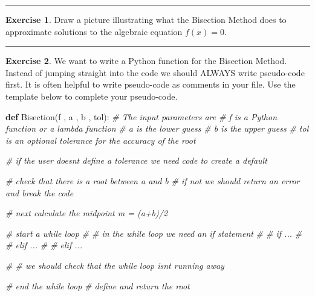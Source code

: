 \documentclass[
]{book}
\newenvironment{Shaded}{\begin{snugshade}}{\end{snugshade}}
\newcommand{\CommentTok}[1]{\textcolor[rgb]{0.56,0.35,0.01}{\textit{#1}}}
\newcommand{\KeywordTok}[1]{\textcolor[rgb]{0.13,0.29,0.53}{\textbf{#1}}}
\newcommand{\NormalTok}[1]{#1}
\theoremstyle{definition}
\theoremstyle{definition}
\theoremstyle{definition}
\newtheorem{exercise}{Exercise}[chapter]
\theoremstyle{remark}
\begin{document}
\begin{center}\rule{0.5\linewidth}{0.5pt}\end{center}

\begin{exercise}
\protect\hypertarget{exr:unnamed-chunk-79}{}{\label{exr:unnamed-chunk-79} }Draw a picture illustrating what the Bisection Method does to
approximate solutions to the algebraic equation \(f(x) = 0\).
\end{exercise}

\begin{center}\rule{0.5\linewidth}{0.5pt}\end{center}

\begin{exercise}
\protect\hypertarget{exr:unnamed-chunk-80}{}{\label{exr:unnamed-chunk-80} }We want to write a Python function for the Bisection Method. Instead of jumping
straight into the code we should ALWAYS write pseudo-code first. It is
often helpful to write pseudo-code as comments in your file. Use the
template below to complete your pseudo-code.
\end{exercise}

\begin{Shaded}
\begin{Highlighting}[]
\KeywordTok{def}\NormalTok{ Bisection(f , a , b , tol):}
\CommentTok{\# The input parameters are}
\CommentTok{\# f is a Python function or a lambda function}
\CommentTok{\# a is the lower guess}
\CommentTok{\# b is the upper guess}
\CommentTok{\# tol is an optional tolerance for the accuracy of the root}

\CommentTok{\# if the user doesn\textquotesingle{}t define a tolerance we need code to create a default}

\CommentTok{\# check that there is a root between a and b}
\CommentTok{\# if not we should return an error and break the code}

\CommentTok{\# next calculate the midpoint m = (a+b)/2}

\CommentTok{\# start a while loop}
\CommentTok{\#   \# in the while loop we need an if statement}
\CommentTok{\#   \# if ...}
\CommentTok{\#   \# elif ...}
\CommentTok{\#   \# elif ...}

\CommentTok{\#   \# we should check that the while loop isn\textquotesingle{}t running away}

\CommentTok{\# end the while loop}
\CommentTok{\# define and return the root}
\end{Highlighting}
\end{Shaded}
\end{document}
